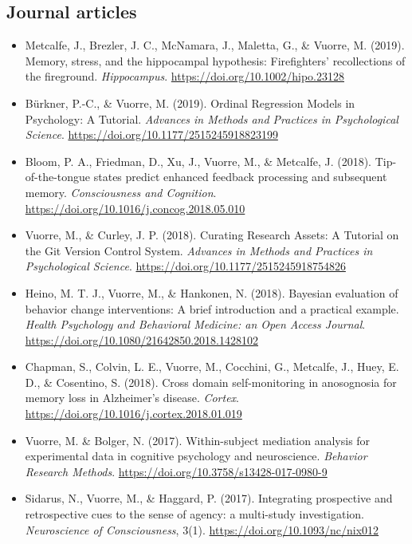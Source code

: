 \documentclass[12pt, a4paper]{article}
\newcommand{\years}[1]{\marginnote{\scriptsize #1}}
\begin{document}
\subsection*{Journal articles}
\begin{itemize}[label={},itemindent=-1em,leftmargin=1em,itemsep=0em]
\item \years{2019} Metcalfe, J., Brezler, J. C., McNamara, J., Maletta, G., \& Vuorre, M. (2019). Memory, stress, and the hippocampal hypothesis: Firefighters' recollections of the fireground. \emph{Hippocampus}. \url{https://doi.org/10.1002/hipo.23128}
\item Bürkner, P.-C., \& Vuorre, M. (2019). Ordinal Regression Models in Psychology: A Tutorial. \emph{Advances in Methods and Practices in Psychological Science}. \url{https://doi.org/10.1177/2515245918823199}
\item \years{2018} Bloom, P. A., Friedman, D., Xu, J., Vuorre, M., \& Metcalfe, J. (2018). Tip-of-the-tongue states predict enhanced feedback processing and subsequent memory. \emph{Consciousness and Cognition}. \url{https://doi.org/10.1016/j.concog.2018.05.010}
\item Vuorre, M., \& Curley, J. P. (2018). Curating Research Assets: A Tutorial on the Git Version Control System. \emph{Advances in Methods and Practices in Psychological Science}. \url{https://doi.org/10.1177/2515245918754826}
\item Heino, M. T. J.\footnotemark[1], Vuorre, M.\footnotemark[1], \& Hankonen, N. (2018). Bayesian evaluation of behavior change interventions: A brief introduction and a practical example. \emph{Health Psychology and Behavioral Medicine: an Open Access Journal}. \url{https://doi.org/10.1080/21642850.2018.1428102}
\item Chapman, S., Colvin, L. E., Vuorre, M., Cocchini, G., Metcalfe, J., Huey, E. D., \& Cosentino, S. (2018). Cross domain self-monitoring in anosognosia for memory loss in Alzheimer's disease. \emph{Cortex}. \url{https://doi.org/10.1016/j.cortex.2018.01.019}
\item \years{2017} Vuorre, M. \& Bolger, N. (2017). Within-subject mediation analysis for experimental data in cognitive psychology and neuroscience. \emph{Behavior Research Methods}. \url{https://doi.org/10.3758/s13428-017-0980-9}
\item Sidarus, N., Vuorre, M., \& Haggard, P. (2017). Integrating prospective and retrospective cues to the sense of agency: a multi-study investigation. \emph{Neuroscience of Consciousness}, 3(1). \url{https://doi.org/10.1093/nc/nix012}

\end{itemize}
\end{document}
